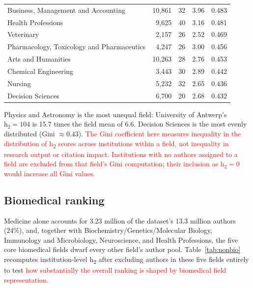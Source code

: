 \begin{table}[h]
\begin{tabular}{@{}lrrrr@{}}
	Business, Management and Accounting & 10,861 & 32 & 3.96 & 0.483 \\
	Health Professions & 9,625 & 40 & 3.16 & 0.481 \\
	Veterinary & 2,157 & 26 & 2.52 & 0.469 \\
	Pharmacology, Toxicology and Pharmaceutics & 4,247 & 26 & 3.00 & 0.456 \\
	Arts and Humanities & 10,263 & 28 & 2.76 & 0.453 \\
	Chemical Engineering & 3,443 & 30 & 2.89 & 0.442 \\
	Nursing & 5,232 & 32 & 2.65 & 0.436 \\
	Decision Sciences & 6,700 & 20 & 2.68 & 0.432 \\
	\bottomrule
	\end{tabular}
\end{table}

Physics and Astronomy is the most unequal field: University of Antwerp's $\mathrm{h}_2=104$ is 15.7 times the field mean of 6.6. Decision Sciences is the most evenly distributed (Gini $\approx 0.43$). \textcolor{red}{The Gini coefficient here measures inequality in the distribution of h\textsubscript{2} scores across institutions within a field, not inequality in research output or citation impact. Institutions with no authors assigned to a field are excluded from that field's Gini computation; their inclusion as $\mathrm{h}_2 = 0$ would increase all Gini values.}

\subsection{Biomedical ranking}
\label{subsec:nonbiomedical}
Medicine alone accounts for 3.23 million of the dataset's 13.3 million authors (24\%), and, together with Biochemistry/Genetics/Molecular Biology, Immunology and Microbiology, Neuroscience, and Health Professions, the five core biomedical fields dwarf every other field's author pool. Table~\ref{tab:nonbio} recomputes institution-level h\textsubscript{2} after excluding authors in these five fields entirely to test \textcolor{red}{how substantially the overall ranking is shaped by biomedical field representation.}

